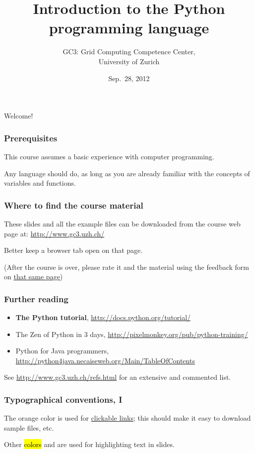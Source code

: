 \documentclass[english,serif,mathserif,xcolor=pdftex,dvipsnames,table]{beamer}
\title[Introduction]{%
  Introduction to the Python programming language
}
\author[GC3]{%
  GC3: Grid Computing Competence Center, \\
  University of Zurich
}
\date{Sep.~28, 2012}
\begin{document}
\maketitle

\begin{frame}
  \begin{center}
    {\Huge Welcome!}
  \end{center}
\end{frame}


\begin{frame}
  \frametitle{Prerequisites}
  This course assumes a basic experience with computer programming.

  \+
  Any language should do, as long as you are already familiar with
  the concepts of variables and functions.
\end{frame}


\begin{frame}
  \frametitle{Where to find the course material}

  These slides and all the example files can be downloaded from the
  course web page at:
  {\small\url{http://www.gc3.uzh.ch/}}

  \+
  Better keep a browser tab open on that page.

  \+
  (After the course is over, please rate it and the material using
  the feedback form on \href{http://www.gc3.uzh.ch/}{that
    same page})
\end{frame}


\begin{frame}
  \frametitle{Further reading}

  \begin{itemize}
    \item \textbf{The Python tutorial},
      {\small \url{http://docs.python.org/tutorial/}}
    \item {The Zen of Python in 3 days},
      {\small \url{http://pixelmonkey.org/pub/python-training/}}
    \item {Python for Java programmers},
      {\small \url{http://python4java.necaiseweb.org/Main/TableOfContents}}
  \end{itemize}

  \+
  See {\small\url{http://www.gc3.uzh.ch/refs.html}}
  for an extensive and commented list.

\end{frame}


\begin{frame}
  \frametitle{Typographical conventions, I}

  The orange color is used for
  \href{http://www.gc3.uzh.ch/}{clickable
    links}; this should make it easy to download sample files, etc.

  \+
  Other \hl{colors} and  are used for highlighting
  text in slides.
\end{frame}
\end{document}
